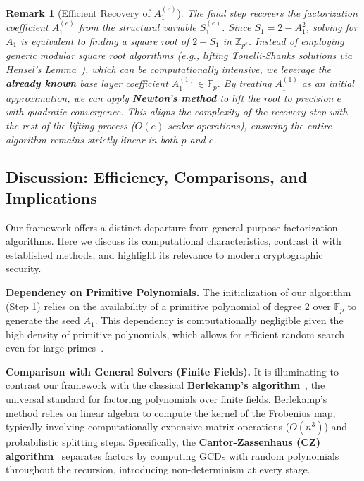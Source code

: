 \documentclass[12pt]{article}
\theoremstyle{plain}
\newtheorem{rem}{Remark}
\numberwithin{equation}{section}
\begin{document}
\begin{rem}[Efficient Recovery of $A_1^{(e)}$]
The final step recovers the factorization coefficient $A_1^{(e)}$ from the structural variable $S_1^{(e)}$. Since $S_1 = 2 - A_1^2$, solving for $A_1$ is equivalent to finding a square root of $2 - S_1$ in $\mathbb{Z}_{p^e}$. Instead of employing generic modular square root algorithms (e.g., lifting Tonelli-Shanks solutions via Hensel's Lemma~\cite{Cohen1993}), which can be computationally intensive, we leverage the \textbf{already known} base layer coefficient $A_1^{(1)} \in \mathbb{F}_p$. By treating $A_1^{(1)}$ as an initial approximation, we can apply \textbf{Newton's method} to lift the root to precision $e$ with quadratic convergence. This aligns the complexity of the recovery step with the rest of the lifting process ($O(e)$ scalar operations), ensuring the entire algorithm remains strictly linear in both $p$ and $e$.
\end{rem}

\subsection{Discussion: Efficiency, Comparisons, and Implications}
\label{subsec:discussion}

Our framework offers a distinct departure from general-purpose factorization algorithms. Here we discuss its computational characteristics, contrast it with established methods, and highlight its relevance to modern cryptographic security.

\textbf{Dependency on Primitive Polynomials.}
The initialization of our algorithm (Step 1) relies on the availability of a primitive polynomial of degree 2 over $\mathbb{F}_p$ to generate the seed $A_1$. This dependency is computationally negligible given the high density of primitive polynomials, which allows for efficient random search even for large primes~\cite{Lidl1997}.


\textbf{Comparison with General Solvers (Finite Fields).} 
It is illuminating to contrast our framework with the classical \textbf{Berlekamp's algorithm}~\cite{Berlekamp1968}, the universal standard for factoring polynomials over finite fields. Berlekamp's method relies on linear algebra to compute the kernel of the Frobenius map, typically involving computationally expensive matrix operations ($O(n^3)$) and probabilistic splitting steps. Specifically, the \textbf{Cantor-Zassenhaus (CZ) algorithm}~\cite{Cantor1981} separates factors by computing GCDs with random polynomials throughout the recursion, introducing non-determinism at every stage.
\end{document}
